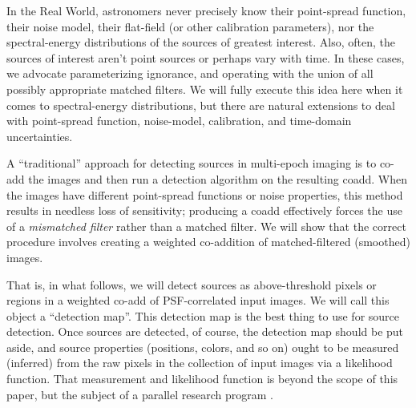 \documentclass[11pt,letterpaper,linenumbers]{aastex7}
\begin{document}
In the Real World, astronomers never precisely know their point-spread
function, their noise model, their flat-field (or other calibration
parameters), nor the spectral-energy distributions of the sources of
greatest interest.
Also, often, the sources of interest aren't point sources or perhaps
vary with time.
In these cases, we advocate parameterizing ignorance, and operating
with the union of all possibly appropriate matched filters.
We will fully execute this idea here when it comes to spectral-energy
distributions, but there are natural extensions to deal with
point-spread function, noise-model, calibration, and time-domain
uncertainties.


A ``traditional'' approach for detecting sources in multi-epoch
imaging is to co-add the images and then run a detection algorithm on
the resulting coadd.  When the images have different point-spread
functions or noise properties, this method results in needless loss of
sensitivity; producing a coadd effectively forces the use of a
\emph{mismatched filter} rather than a matched filter.  We will show
that the correct procedure involves creating a weighted co-addition of
matched-filtered (smoothed) images.


That is, in what follows, we will detect sources as above-threshold
pixels or regions in a weighted co-add of PSF-correlated input images.
We will call this object a ``detection map''.  This detection map is
the best thing to use for source detection.  Once sources are
detected, of course, the detection map should be put aside, and source
properties (positions, colors, and so on) ought to be measured
(inferred) from the raw pixels in the collection of input images via a
likelihood function.  That measurement and likelihood function is
beyond the scope of this paper, but the subject of a parallel research
program \citep[eg,][]{unwise-phot, lsoverview}.
\end{document}
